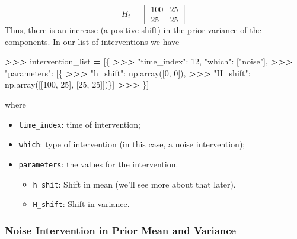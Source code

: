 \documentclass[
]{article}
\newenvironment{Shaded}{\begin{snugshade}}{\end{snugshade}}
\newcommand{\DecValTok}[1]{\textcolor[rgb]{0.00,0.00,0.81}{#1}}
\newcommand{\NormalTok}[1]{#1}
\newcommand{\OperatorTok}[1]{\textcolor[rgb]{0.81,0.36,0.00}{\textbf{#1}}}
\newcommand{\StringTok}[1]{\textcolor[rgb]{0.31,0.60,0.02}{#1}}
\providecommand{\tightlist}{%
  \setlength{\itemsep}{0pt}\setlength{\parskip}{0pt}}
\begin{document}
\[
  H_t = \begin{bmatrix}
    100 & 25 \\
    25 & 25
  \end{bmatrix}
\] Thus, there is an increase (a positive shift) in the prior variance
of the components. In our list of interventions we have

\begin{Shaded}
\begin{Highlighting}[]
\OperatorTok{\textgreater{}\textgreater{}\textgreater{}}\NormalTok{ intervention\_list }\OperatorTok{=}\NormalTok{ [\{}
\OperatorTok{\textgreater{}\textgreater{}\textgreater{}}   \StringTok{"time\_index"}\NormalTok{: }\DecValTok{12}\NormalTok{, }\StringTok{"which"}\NormalTok{: [}\StringTok{"noise"}\NormalTok{],}
\OperatorTok{\textgreater{}\textgreater{}\textgreater{}}   \StringTok{"parameters"}\NormalTok{: [\{}
\OperatorTok{\textgreater{}\textgreater{}\textgreater{}}     \StringTok{"h\_shift"}\NormalTok{: np.array([}\DecValTok{0}\NormalTok{, }\DecValTok{0}\NormalTok{]),}
\OperatorTok{\textgreater{}\textgreater{}\textgreater{}}     \StringTok{"H\_shift"}\NormalTok{: np.array([[}\DecValTok{100}\NormalTok{, }\DecValTok{25}\NormalTok{], [}\DecValTok{25}\NormalTok{, }\DecValTok{25}\NormalTok{]])\}]}
\OperatorTok{\textgreater{}\textgreater{}\textgreater{}}\NormalTok{ \}]}
\end{Highlighting}
\end{Shaded}

where

\begin{itemize}
\tightlist
\item
  \texttt{time\_index}: time of intervention;
\item
  \texttt{which}: type of intervention (in this case, a noise
  intervention);
\item
  \texttt{parameters}: the values for the intervention.

  \begin{itemize}
  \tightlist
  \item
    \texttt{h\_shit}: Shift in mean (we'll see more about that later).
  \item
    \texttt{H\_shift}: Shift in variance.
  \end{itemize}
\end{itemize}

\hypertarget{noise-intervention-in-prior-mean-and-variance}{%
\subsubsection{Noise Intervention in Prior Mean and
Variance}\label{noise-intervention-in-prior-mean-and-variance}}
\end{document}
